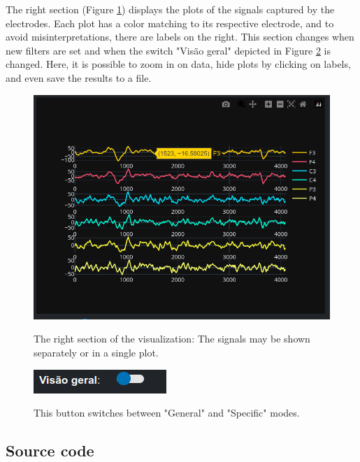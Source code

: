 \documentclass[format=sigconf]{acmart}
\begin{document}
			
		
			\par The right section (Figure \ref{fig:screenshotright}) displays the plots of the signals captured by the electrodes. Each plot has a color matching to its respective electrode, and to avoid misinterpretations, there are labels on the right. This section changes when new filters are set and when the switch "Visão geral" depicted in Figure \ref{fig:screenshotbotton} is changed. Here, it is possible to zoom in on data, hide plots by clicking on labels, and even save the results to a file.
			
			\begin{figure}[h]
				\centering
				\caption{The right section of the visualization: The signals may be shown separately or in a single plot.}
				\includegraphics[width=\linewidth]{images/screenshotRight}
				\label{fig:screenshotright}
			\end{figure}
			
			
			\begin{figure}[h]
				\centering
				\caption{This button switches between "General" and "Specific" modes.}
				\includegraphics{images/screenshotBotton}
				\label{fig:screenshotbotton}
			\end{figure}
		\subsection{Source code}
		
\end{document}
